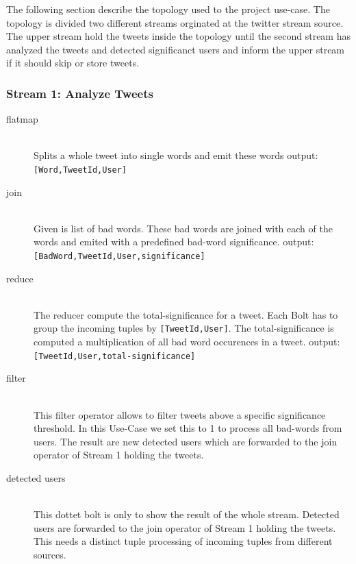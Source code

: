 The following section describe the topology used to the project use-case. The topology is divided two different streams orginated at the twitter stream source. The upper stream hold the tweets inside the topology until the second stream has analyzed the tweets and detected significanct users and inform the upper stream if it should skip or store tweets.

\subsubsection{Stream 1: Analyze Tweets}
\begin{description}
  \item[flatmap] \hfill \\
      Splits a whole tweet into single words and emit these words
      \newline output: \texttt{[Word,TweetId,User]}
  
  \item[join] \hfill \\
      Given is list of bad words. These bad words are joined with each of the words and emited with a predefined bad-word significance.
      \newline output: \texttt{[BadWord,TweetId,User,significance]}
  \item[reduce] \hfill \\
      The reducer compute the total-significance for a tweet. Each Bolt has to group the incoming tuples by \newline \texttt{[TweetId,User]}. The total-significance is computed a multiplication of all bad word occurences in a tweet.
      \newline output: \texttt{[TweetId,User,total-significance]}
      
  \item[filter] \hfill \\
      This filter operator allows to filter tweets above a specific significance threshold. In this Use-Case we set this to 1 to process all bad-words from users. The result are new detected users which are forwarded to the join operator of Stream 1 holding the tweets.

  \item[detected users] \hfill \\
      This dottet bolt is only to show the result of the whole stream. Detected users are forwarded to the join operator of Stream 1 holding the tweets. This needs a distinct tuple processing of incoming tuples from different sources. 
      
\end{description}

